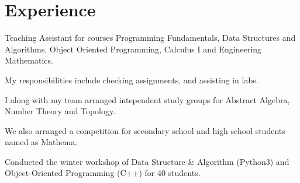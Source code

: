 \documentclass[]{resume}
\begin{document}


%
%

\begin{minipage}[t]{0.5\textwidth}


    \section{Experience}

    \vspace{\topsep} %
    \begin{tightemize}
        \sectionsep
        \item Teaching Assistant for courses Programming Fundamentals, Data Structures and Algorithms, Object Oriented Programming, Calculus I and Engineering Mathematics.
        \item My responsibilities include checking assignments, and assisting in labs.
    \end{tightemize}
    \begin{tightemize}
        \sectionsep
        \item I along with my team arranged intependent study groups for Abstract Algebra, Number Theory and Topology.
        \item We also arranged a competition for secondary school and high school students named as Mathema.
    \end{tightemize}

    \begin{tightemize}
        \sectionsep
        \item Conducted the winter workshop of Data Structure \& Algorithm (Python3) and Object-Oriented Programming (C++) for 40 students.
    \end{tightemize}


\end{minipage}
\end{document}
